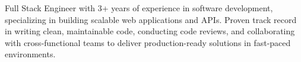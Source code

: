 Full Stack Engineer with 3+ years of experience in software development, specializing in building scalable web applications and APIs. Proven track record in writing clean, maintainable code, conducting code reviews, and collaborating with cross-functional teams to deliver production-ready solutions in fast-paced environments.